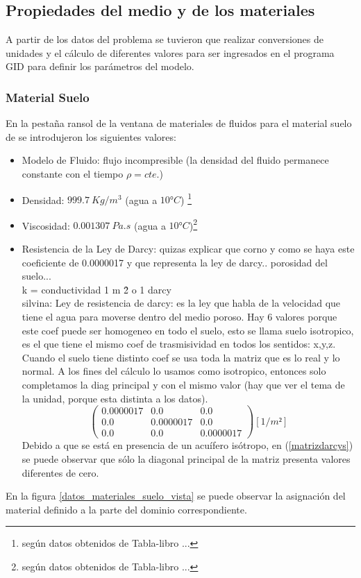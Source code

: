 \documentclass[10pt,a4paper,final]{article}
\begin{document}
\subsection{Propiedades del medio y de los materiales}
A partir de los datos del problema se tuvieron que realizar conversiones de unidades y el cálculo de diferentes valores para ser ingresados en el programa GID para definir los parámetros del modelo.
\subsubsection{Material Suelo}
En la pestaña ransol de la ventana de materiales de fluidos para el material suelo de  se introdujeron los siguientes valores:
\begin{itemize}
\item Modelo de Fluido: flujo incompresible (la densidad del fluido permanece constante con el tiempo $\rho = cte.$)
\item Densidad: $999.7~Kg/m^3$ (agua a $10° C$) \footnote{ según datos obtenidos de Tabla-libro ...}
\item Viscosidad: $0.001307~Pa.s$ (agua a $10° C$)\footnote{ según datos obtenidos de Tabla-libro ...}
\item Resistencia de la Ley de Darcy:
quizas explicar que corno y como se haya este coeficiente de 0.0000017 y que representa la ley de darcy.. porosidad del suelo...\\
	k = conductividad 1\/ m \^2 o 1 \/ darcy\\
silvina: Ley de resistencia de darcy: es la ley que habla de la velocidad que tiene el agua para moverse dentro del medio poroso. Hay 6 valores porque este coef puede ser homogeneo en todo el suelo, esto se llama suelo isotropico, es el que tiene el mismo coef de trasmisividad en todos los sentidos: x,y,z. Cuando el suelo tiene distinto coef se usa toda la matriz que es lo real y lo normal. A los fines del cálculo lo usamos como isotropico, entonces solo completamos la diag principal y con el mismo valor (hay que ver el tema de la unidad, porque esta distinta a los datos). 
\begin{equation}
\begin{pmatrix}{}
0.0000017 & 0.0 & 0.0 \\ 
0.0 & 0.0000017 & 0.0 \\ 
0.0 & 0.0 & 0.0000017
\end{pmatrix} [1/m²]
\label{matrizdarcys}
\end{equation}
Debido a que se está en presencia de un acuífero isótropo, en (\ref{matrizdarcys}) se puede observar que sólo la diagonal principal de la matriz presenta valores diferentes de cero.
\end{itemize}
En la figura \ref{datos_materiales_suelo_vista} se puede observar la asignación del material definido a la parte del dominio correspondiente.
\end{document}
